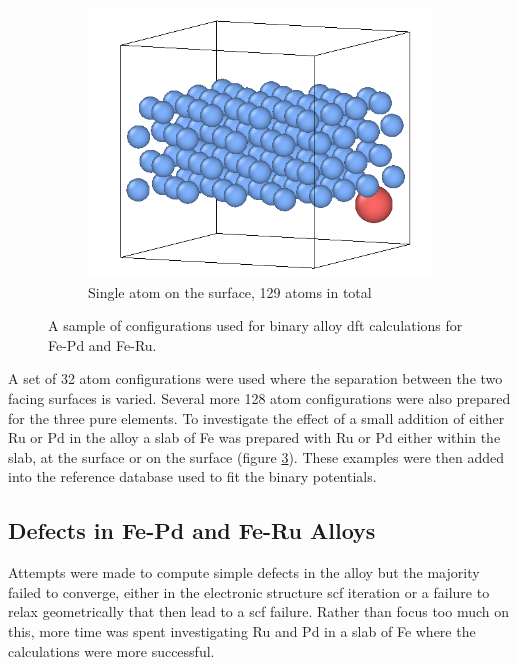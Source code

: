 \begin{figure}[htb]
\begin{subfigure}{.32\textwidth}
  \label{fig:sub-first}
\end{subfigure}
\begin{subfigure}{.32\textwidth}
  \centering
  \includegraphics[width=.94\linewidth]{chapters/potentials_fe_pd_ru/slabs/slab03.png}  
  \caption{Single atom on the surface, 129 atoms in total}
  \label{fig:sub-first}
\end{subfigure}
\caption{A sample of configurations used for binary alloy \acrshort{dft} calculations for Fe-Pd and Fe-Ru.}
\label{fig:binaryalloyconfigurationsslab}
\end{figure}

A set of 32 atom configurations were used where the separation between the two facing surfaces is varied.  Several more 128 atom configurations were also prepared for the three pure elements.  To investigate the effect of a small addition of either Ru or Pd in the alloy a slab of Fe was prepared with Ru or Pd either within the slab, at the surface or on the surface (figure \ref{fig:binaryalloyconfigurationsslab}).  These examples were then added into the reference database used to fit the binary potentials.



\FloatBarrier
\subsection{Defects in Fe-Pd and Fe-Ru Alloys}

Attempts were made to compute simple defects in the alloy but the majority failed to converge, either in the electronic structure \acrshort{scf} iteration or a failure to relax geometrically that then lead to a \acrshort{scf} failure.  Rather than focus too much on this, more time was spent investigating Ru and Pd in a slab of Fe where the calculations were more successful.
















